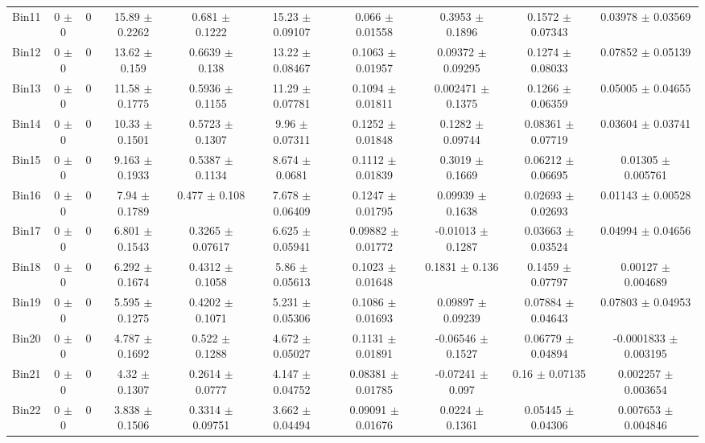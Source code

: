 \begin{tabular}{@{\extracolsep{4pt}}lccccccccc@{}}
     Bin11 & 0 $\pm$ 0 & 0 & 15.89 $\pm$ 0.2262 & 0.681 $\pm$ 0.1222 & 15.23 $\pm$ 0.09107 & 0.066 $\pm$ 0.01558 & 0.3953 $\pm$ 0.1896 & 0.1572 $\pm$ 0.07343 & 0.03978 $\pm$ 0.03569 \\ 
     Bin12 & 0 $\pm$ 0 & 0 & 13.62 $\pm$ 0.159 & 0.6639 $\pm$ 0.138 & 13.22 $\pm$ 0.08467 & 0.1063 $\pm$ 0.01957 & 0.09372 $\pm$ 0.09295 & 0.1274 $\pm$ 0.08033 & 0.07852 $\pm$ 0.05139 \\ 
     Bin13 & 0 $\pm$ 0 & 0 & 11.58 $\pm$ 0.1775 & 0.5936 $\pm$ 0.1155 & 11.29 $\pm$ 0.07781 & 0.1094 $\pm$ 0.01811 & 0.002471 $\pm$ 0.1375 & 0.1266 $\pm$ 0.06359 & 0.05005 $\pm$ 0.04655 \\ 
     Bin14 & 0 $\pm$ 0 & 0 & 10.33 $\pm$ 0.1501 & 0.5723 $\pm$ 0.1307 & 9.96 $\pm$ 0.07311 & 0.1252 $\pm$ 0.01848 & 0.1282 $\pm$ 0.09744 & 0.08361 $\pm$ 0.07719 & 0.03604 $\pm$ 0.03741 \\ 
     Bin15 & 0 $\pm$ 0 & 0 & 9.163 $\pm$ 0.1933 & 0.5387 $\pm$ 0.1134 & 8.674 $\pm$ 0.0681 & 0.1112 $\pm$ 0.01839 & 0.3019 $\pm$ 0.1669 & 0.06212 $\pm$ 0.06695 & 0.01305 $\pm$ 0.005761 \\ 
     Bin16 & 0 $\pm$ 0 & 0 & 7.94 $\pm$ 0.1789 & 0.477 $\pm$ 0.108 & 7.678 $\pm$ 0.06409 & 0.1247 $\pm$ 0.01795 & 0.09939 $\pm$ 0.1638 & 0.02693 $\pm$ 0.02693 & 0.01143 $\pm$ 0.00528 \\ 
     Bin17 & 0 $\pm$ 0 & 0 & 6.801 $\pm$ 0.1543 & 0.3265 $\pm$ 0.07617 & 6.625 $\pm$ 0.05941 & 0.09882 $\pm$ 0.01772 & -0.01013 $\pm$ 0.1287 & 0.03663 $\pm$ 0.03524 & 0.04994 $\pm$ 0.04656 \\ 
     Bin18 & 0 $\pm$ 0 & 0 & 6.292 $\pm$ 0.1674 & 0.4312 $\pm$ 0.1058 & 5.86 $\pm$ 0.05613 & 0.1023 $\pm$ 0.01648 & 0.1831 $\pm$ 0.136 & 0.1459 $\pm$ 0.07797 & 0.00127 $\pm$ 0.004689 \\ 
     Bin19 & 0 $\pm$ 0 & 0 & 5.595 $\pm$ 0.1275 & 0.4202 $\pm$ 0.1071 & 5.231 $\pm$ 0.05306 & 0.1086 $\pm$ 0.01693 & 0.09897 $\pm$ 0.09239 & 0.07884 $\pm$ 0.04643 & 0.07803 $\pm$ 0.04953 \\ 
     Bin20 & 0 $\pm$ 0 & 0 & 4.787 $\pm$ 0.1692 & 0.522 $\pm$ 0.1288 & 4.672 $\pm$ 0.05027 & 0.1131 $\pm$ 0.01891 & -0.06546 $\pm$ 0.1527 & 0.06779 $\pm$ 0.04894 & -0.0001833 $\pm$ 0.003195 \\ 
     Bin21 & 0 $\pm$ 0 & 0 & 4.32 $\pm$ 0.1307 & 0.2614 $\pm$ 0.0777 & 4.147 $\pm$ 0.04752 & 0.08381 $\pm$ 0.01785 & -0.07241 $\pm$ 0.097 & 0.16 $\pm$ 0.07135 & 0.002257 $\pm$ 0.003654 \\ 
     Bin22 & 0 $\pm$ 0 & 0 & 3.838 $\pm$ 0.1506 & 0.3314 $\pm$ 0.09751 & 3.662 $\pm$ 0.04494 & 0.09091 $\pm$ 0.01676 & 0.0224 $\pm$ 0.1361 & 0.05445 $\pm$ 0.04306 & 0.007653 $\pm$ 0.004846 \\ 

\end{tabular}

